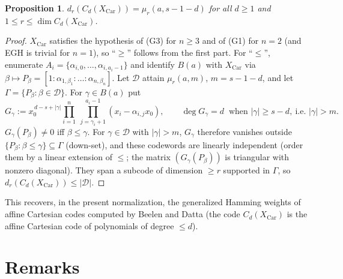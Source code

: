 \documentclass[11pt]{amsart}
\newtheorem{proposition}[theorem]{Proposition}
\theoremstyle{remark}
\theoremstyle{definition}
\newcommand{\Car}{\mathrm{Car}}
\begin{document}
\begin{proposition}\label{prop:cart}
$d_r(C_d(X_\Car))=\mu_r(a,s-1-d)$ for all $d\ge1$ and $1\le r\le\dim C_d(X_\Car)$.
\end{proposition}
\begin{proof}
$X_\Car$ satisfies the hypothesis of (G3) for $n\ge3$ and of (G1) for $n=2$ (and EGH is trivial for $n=1$),
so ``$\ge$'' follows from the first part. For ``$\le$'', enumerate $A_i=\{\alpha_{i,0},\dots,\alpha_{i,a_i-1}\}$
and identify $B(a)$ with $X_\Car$ via $\beta\mapsto P_\beta=[1:\alpha_{1,\beta_1}:\dots:\alpha_{n,\beta_n}]$.
Let $\mathcal D$ attain $\mu_r(a,m)$, $m=s-1-d$, and let $\Gamma=\{P_\beta:\beta\in\mathcal D\}$. For
$\gamma\in B(a)$ put
\[
 G_\gamma:=x_0^{\,d-s+|\gamma|}\prod_{i=1}^n\ \prod_{j=\gamma_i+1}^{a_i-1}(x_i-\alpha_{i,j}x_0),
 \qquad \deg G_\gamma=d\ \text{ when } |\gamma|\ge s-d,\ \text{i.e. } |\gamma|>m .
\]
$G_\gamma(P_\beta)\ne0$ iff $\beta\le\gamma$. For $\gamma\in\mathcal D$ with $|\gamma|>m$, $G_\gamma$ therefore vanishes
outside $\{P_\beta:\beta\le\gamma\}\subseteq\Gamma$ (down-set), and these codewords are linearly independent
(order them by a linear extension of $\le$; the matrix $(G_\gamma(P_\beta))$ is triangular with nonzero
diagonal). They span a subcode of dimension $\ge r$ supported in $\Gamma$, so
$d_r(C_d(X_\Car))\le|\mathcal D|$.
\end{proof}
This recovers, in the present normalization, the generalized Hamming weights of affine Cartesian
codes computed by Beelen and Datta \cite{BeelenDatta} (the code $C_d(X_\Car)$ is the affine Cartesian
code of polynomials of degree $\le d$).

\section{Remarks}
\end{document}
